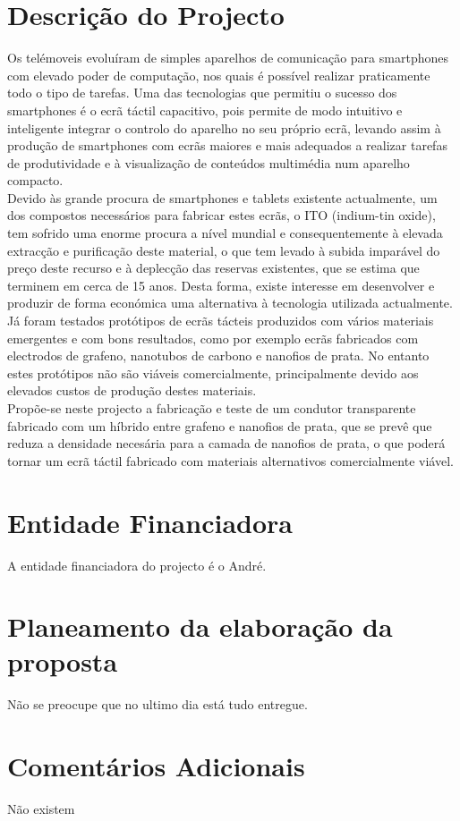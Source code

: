\documentclass[%
	nofootinbib,
	amsmath,amssymb,
	aps,
	12pt,
	a4paper
]{article}
\begin{document}
\section{Descrição do Projecto}
Os telémoveis evoluíram de simples aparelhos de comunicação para smartphones com elevado poder de computação, nos quais é possível realizar praticamente todo o tipo de tarefas. Uma das tecnologias que permitiu o sucesso dos smartphones é o ecrã táctil capacitivo, pois permite de modo intuitivo e inteligente integrar o controlo do aparelho no seu próprio ecrã, levando assim à produção de smartphones com ecrãs maiores e mais adequados a realizar tarefas de produtividade e à visualização de conteúdos multimédia num aparelho compacto.\\
Devido às grande procura de smartphones e tablets existente actualmente, um dos compostos necessários para fabricar estes ecrãs, o ITO (indium-tin oxide), tem sofrido uma enorme procura a nível mundial e consequentemente à elevada extracção e purificação deste material, o que tem levado à subida imparável do preço deste recurso e à deplecção das reservas existentes, que se estima que terminem em cerca de 15 anos. Desta forma, existe interesse em desenvolver e produzir de forma económica uma alternativa à tecnologia utilizada actualmente.\\
Já foram testados protótipos de ecrãs tácteis produzidos com vários materiais emergentes e com bons resultados, como por exemplo ecrãs fabricados com electrodos de grafeno, nanotubos de carbono e nanofios de prata. No entanto estes protótipos não são viáveis comercialmente, principalmente devido aos elevados custos de produção destes materiais.\\
Propõe-se neste projecto a fabricação e teste de um condutor transparente fabricado com um híbrido entre grafeno e nanofios de prata, que se prevê que reduza a densidade necesária para a camada de nanofios de prata, o que poderá tornar um ecrã táctil fabricado com materiais alternativos comercialmente viável.
\section{Entidade Financiadora}
A entidade financiadora do projecto é o André.
\section{Planeamento da elaboração da proposta}
Não se preocupe que no ultimo dia está tudo entregue.
\section{Comentários Adicionais}
Não existem



\nocite{*}
{}
\end{document}
